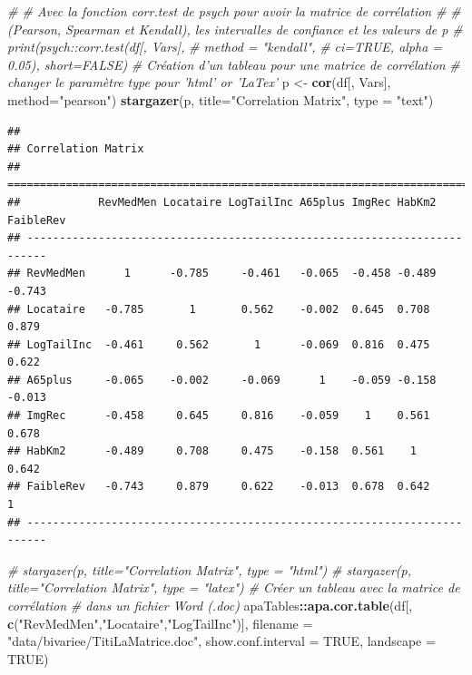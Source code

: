 \documentclass[
  11pt,
  french,
]{book}
\makeatletter
\newenvironment{Shaded}{\begin{snugshade}}{\end{snugshade}}
\newcommand{\CommentTok}[1]{\textcolor[rgb]{0.56,0.35,0.01}{\textit{#1}}}
\newcommand{\DataTypeTok}[1]{\textcolor[rgb]{0.13,0.29,0.53}{#1}}
\newcommand{\KeywordTok}[1]{\textcolor[rgb]{0.13,0.29,0.53}{\textbf{#1}}}
\newcommand{\NormalTok}[1]{#1}
\newcommand{\OperatorTok}[1]{\textcolor[rgb]{0.81,0.36,0.00}{\textbf{#1}}}
\newcommand{\OtherTok}[1]{\textcolor[rgb]{0.56,0.35,0.01}{#1}}
\newcommand{\StringTok}[1]{\textcolor[rgb]{0.31,0.60,0.02}{#1}}
\newenvironment{kframe}{%
\medskip{}
\setlength{\fboxsep}{.8em}
 \def\at@end@of@kframe{}%
 \ifinner\ifhmode%
  \def\at@end@of@kframe{\end{minipage}}%
  \begin{minipage}{\columnwidth}%
 \fi\fi%
 \def\FrameCommand##1{\hskip\@totalleftmargin \hskip-\fboxsep
 \colorbox{shadecolor}{##1}\hskip-\fboxsep
     \hskip-\linewidth \hskip-\@totalleftmargin \hskip\columnwidth}%
 \MakeFramed {\advance\hsize-\width
   \@totalleftmargin\z@ \linewidth\hsize
   \@setminipage}}%
 {\par\unskip\endMakeFramed%
 \at@end@of@kframe}
\renewenvironment{Shaded}{\begin{kframe}}{\end{kframe}}
\makeatother
\begin{document}
\begin{Shaded}
\begin{Highlighting}[]
\CommentTok{# # Avec la fonction corr.test de psych pour avoir la matrice de corrélation}
\CommentTok{# # (Pearson, Spearman et Kendall), les intervalles de confiance et les valeurs de p}
\CommentTok{# print(psych::corr.test(df[, Vars], }
\CommentTok{#              method = "kendall", }
\CommentTok{#              ci=TRUE, alpha = 0.05), short=FALSE) }
\CommentTok{# Création d'un tableau pour une matrice de corrélation}
\CommentTok{# changer le paramètre type pour 'html' or 'LaTex'}
\NormalTok{p <-}\StringTok{ }\KeywordTok{cor}\NormalTok{(df[, Vars], }\DataTypeTok{method=}\StringTok{"pearson"}\NormalTok{)}
\KeywordTok{stargazer}\NormalTok{(p, }\DataTypeTok{title=}\StringTok{"Correlation Matrix"}\NormalTok{, }\DataTypeTok{type =} \StringTok{"text"}\NormalTok{)}
\end{Highlighting}
\end{Shaded}

\begin{verbatim}
## 
## Correlation Matrix
## =========================================================================
##            RevMedMen Locataire LogTailInc A65plus ImgRec HabKm2 FaibleRev
## -------------------------------------------------------------------------
## RevMedMen      1      -0.785     -0.461   -0.065  -0.458 -0.489  -0.743  
## Locataire   -0.785       1       0.562    -0.002  0.645  0.708    0.879  
## LogTailInc  -0.461     0.562       1      -0.069  0.816  0.475    0.622  
## A65plus     -0.065    -0.002     -0.069      1    -0.059 -0.158  -0.013  
## ImgRec      -0.458     0.645     0.816    -0.059    1    0.561    0.678  
## HabKm2      -0.489     0.708     0.475    -0.158  0.561    1      0.642  
## FaibleRev   -0.743     0.879     0.622    -0.013  0.678  0.642      1    
## -------------------------------------------------------------------------
\end{verbatim}

\begin{Shaded}
\begin{Highlighting}[]
\CommentTok{# stargazer(p, title="Correlation Matrix", type = "html")}
\CommentTok{# stargazer(p, title="Correlation Matrix", type = "latex")}
\CommentTok{# Créer un tableau avec la matrice de corrélation }
\CommentTok{# dans un fichier Word (.doc)}
\NormalTok{apaTables}\OperatorTok{::}\KeywordTok{apa.cor.table}\NormalTok{(df[, }\KeywordTok{c}\NormalTok{(}\StringTok{"RevMedMen"}\NormalTok{,}\StringTok{"Locataire"}\NormalTok{,}\StringTok{"LogTailInc"}\NormalTok{)], }
                         \DataTypeTok{filename =} \StringTok{"data/bivariee/TitiLaMatrice.doc"}\NormalTok{,}
                         \DataTypeTok{show.conf.interval =} \OtherTok{TRUE}\NormalTok{,}
                         \DataTypeTok{landscape =} \OtherTok{TRUE}\NormalTok{)}
\end{Highlighting}
\end{Shaded}
\end{document}
